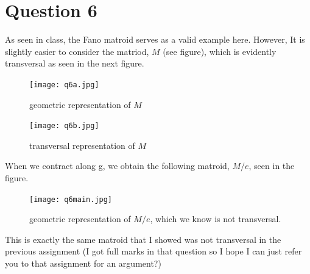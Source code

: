 \documentclass{article}
\begin{document}
\section*{Question 6}
As seen in class, the Fano matroid serves as a valid example here. 
However, It is slightly easier to consider the matriod, $M$ (see figure), which is evidently transversal
as seen in the next figure.


\begin{figure}
    \centering
            \texttt{[image: q6a.jpg]}
            \caption{geometric representation of $M$}
        \end{figure}

\begin{figure}
    \centering
            \texttt{[image: q6b.jpg]}
            \caption{transversal representation of $M$}
        \end{figure}
When we contract along g, we obtain the following matroid, $M/e$, seen in the figure.
\begin{figure}
    \centering
            \texttt{[image: q6main.jpg]}
            \caption{geometric representation of $M/e$, which we know is not transversal.}
        \end{figure}
This is exactly the same matroid that I showed was not transversal in the previous assignment 
(I got full marks in that question so I hope I can just refer you to that assignment for an argument?)
\end{document}
